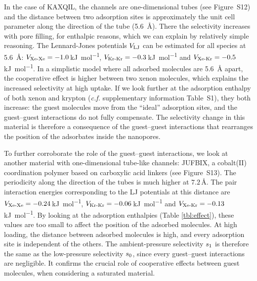 \documentclass[main.tex]{subfiles}
\begin{document}
  In the case of KAXQIL, the channels are one-dimensional tubes (see Figure~S12) and the distance between two adsorption sites is approximately the unit cell parameter along the direction of the tube (\SI{5.6}{\angstrom}). There the selectivity increases with pore filling, for enthalpic reasons, which we can explain by relatively simple reasoning. The Lennard-Jones potentials $V_{\text{LJ}}$ can be estimated for all species at \SI{5.6}{\angstrom}: $V_{\text{Xe-Xe}}=-1.0$\,\si{\kilo\joule\per\mol}, $V_{\text{Kr-Kr}}=-0.3$\,\si{\kilo\joule\per\mol} and $V_{\text{Xe-Kr}}=-0.5$\,\si{\kilo\joule\per\mol}. In a simplistic model where all adsorbed molecules are \SI{5.6}{\angstrom} apart, the cooperative effect is higher between two xenon molecules, which explains the increased selectivity at high uptake. If we look further at the adsorption enthalpy of both xenon and krypton (\emph{c.f.} supplementary information Table~S1), they both increase: the guest molecules move from the ``ideal'' adsorption sites, and the guest--guest interactions do not fully compensate. The selectivity change in this material is therefore a consequence of the guest--guest interactions that rearranges the position of the adsorbates inside the nanopores.
  
  To further corroborate the role of the guest--guest interactions, we look at another material with one-dimensional tube-like channels: JUFBIX, a cobalt(II) coordination polymer based on carboxylic acid linkers (see Figure~S13).\cite{JUFBIX} The periodicity along the direction of the tubes is much higher at $7.2$\,\si{\angstrom}. The pair interaction energies corresponding to the LJ potentials at this distance are $V_{\text{Xe-Xe}}=-0.24$\,\si{\kilo\joule\per\mol}, $V_{\text{Kr-Kr}}=-0.06$\,\si{\kilo\joule\per\mol} and $V_{\text{Xe-Kr}}=-0.13$\,\si{\kilo\joule\per\mol}. By looking at the adsorption enthalpies (Table \ref{tbl:effect}), these values are too small to affect the position of the adsorbed molecules. At high loading, the distance between adsorbed molecules is high, and every adsorption site is independent of the others. The ambient-pressure selectivity $s_{\text{1}}$ is therefore the same as the low-pressure selectivity $s_{\text{0}}$, since every guest--guest interactions are negligible. It confirms the crucial role of cooperative effects between guest molecules, when considering a saturated material.
  
\end{document}
